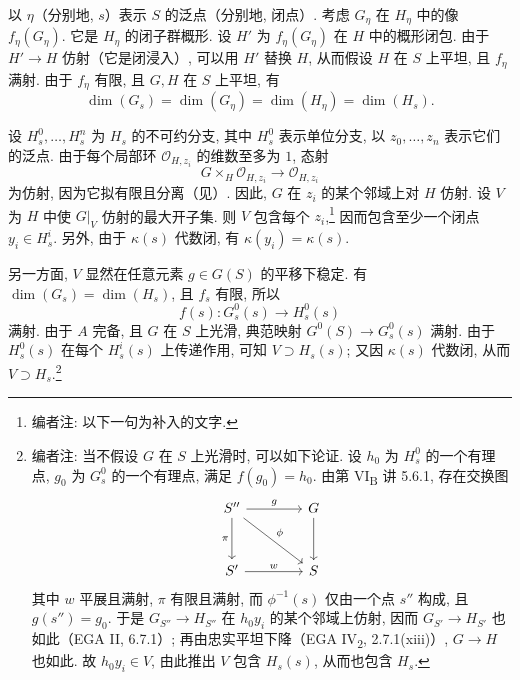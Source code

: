 
以 \(\eta\)（分别地, \(s\)）表示 \(S\) 的泛点（分别地, 闭点）. 考虑 \(G_\eta\) 在 \(H_\eta\) 中的像 \(f_\eta(G_\eta)\). 它是 \(H_\eta\) 的闭子群概形. 设 \(H'\) 为 \(f_\eta(G_\eta)\) 在 \(H\) 中的概形闭包. 由于 \(H'\to H\) 仿射（它是闭浸入）, 可以用 \(H'\) 替换 \(H\), 从而假设 \(H\) 在 \(S\) 上平坦, 且 \(f_\eta\) 满射. 由于 \(f_\eta\) 有限, 且 \(G,H\) 在 \(S\) 上平坦, 有
\[
 \dim(G_s)=\dim(G_\eta)=\dim(H_\eta)=\dim(H_s).
\]


设 \(H_s^0,\ldots,H_s^n\) 为 \(H_s\) 的不可约分支, 其中 \(H_s^0\) 表示单位分支, 以 \(z_0,\ldots,z_n\) 表示它们的泛点. 由于每个局部环 \(\mathcal O_{H,z_i}\) 的维数至多为 \(1\), 态射
\[
 G\times_H\mathcal O_{H,z_i}\longrightarrow\mathcal O_{H,z_i}
\]
为仿射, 因为它拟有限且分离（见）. 因此, \(G\) 在 \(z_i\) 的某个邻域上对 \(H\) 仿射. 设 \(V\) 为 \(H\) 中使 \(G|_V\) 仿射的最大开子集. 则 \(V\) 包含每个 \(z_i\),\footnote{编者注: 以下一句为补入的文字.} 因而包含至少一个闭点 \(y_i\in H_s^i\). 另外, 由于 \(\kappa(s)\) 代数闭, 有 \(\kappa(y_i)=\kappa(s)\).

另一方面, \(V\) 显然在任意元素 \(g\in G(S)\) 的平移下稳定. 有 \(\dim(G_s)=\dim(H_s)\), 且 \(f_s\) 有限, 所以
\[
 f(s)\colon G_s^0(s)\longrightarrow H_s^0(s)
\]
满射. 由于 \(A\) 完备, 且 \(G\) 在 \(S\) 上光滑, 典范映射 \(G^0(S)\to G_s^0(s)\) 满射. 由于 \(H_s^0(s)\) 在每个 \(H_s^i(s)\) 上传递作用, 可知 \(V\supset H_s(s)\); 又因 \(\kappa(s)\) 代数闭, 从而 \(V\supset H_s\).\footnote{编者注: 当不假设 \(G\) 在 \(S\) 上光滑时, 可以如下论证. 设 \(h_0\) 为 \(H_s^0\) 的一个有理点, \(g_0\) 为 \(G_s^0\) 的一个有理点, 满足 \(f(g_0)=h_0\). 由第 VI\textsubscript{B} 讲 5.6.1, 存在交换图
\[
\begin{tikzcd}[ampersand replacement=\&,column sep=4.0em,row sep=3.0em]
S'' \arrow[r,"g"] \arrow[d,"\pi"'] \arrow[dr,"\phi"]
  \& G \arrow[d]\\
S' \arrow[r,"w"] \& S
\end{tikzcd}
\]
其中 \(w\) 平展且满射, \(\pi\) 有限且满射, 而 \(\phi^{-1}(s)\) 仅由一个点 \(s''\) 构成, 且 \(g(s'')=g_0\). 于是 \(G_{S''}\to H_{S''}\) 在 \(h_0y_i\) 的某个邻域上仿射, 因而 \(G_{S'}\to H_{S'}\) 也如此（EGA II, 6.7.1）; 再由忠实平坦下降（EGA IV\textsubscript{2}, 2.7.1(xiii)）, \(G\to H\) 也如此. 故 \(h_0y_i\in V\), 由此推出 \(V\) 包含 \(H_s(s)\), 从而也包含 \(H_s\).}

